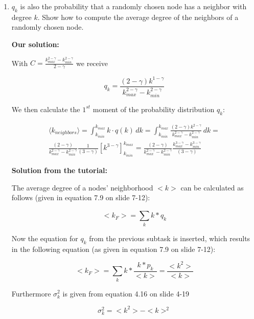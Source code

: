\begin{enumerate}
	\item $q_k$ is also the probability that a randomly chosen node has a neighbor with degree $k$. Show how to compute the average degree of the neighbors of a randomly chosen node.
	
	\textbf{Our solution:}
	
	With $C = \frac{k_{max}^{2-\gamma} - k_{min}^{2-\gamma}}{2-\gamma}$ we receive
	
	\begin{equation}
		q_k = \frac{(2-\gamma)k^{1-\gamma}}{k_{max}^{2-\gamma} - k_{min}^{2-\gamma}}
	\end{equation}

	We then calculate the $1^{st}$ moment of the probability distribution $q_k$:
	
	\begin{equation} \label{k_neighbors}
		\begin{split}
			\langle k_{neighbors} \rangle = \int_{k_{min}}^{k_{max}} k \cdot q(k) \, dk = \int_{k_{min}}^{k_{max}} \frac{(2-\gamma)k^{2-\gamma}}{k_{max}^{2-\gamma} - k_{min}^{2-\gamma}} \, dk = \\
			\frac{(2-\gamma)}{k_{max}^{2-\gamma} - k_{min}^{2-\gamma}} \frac{1}{(3-\gamma)} [k^{3-\gamma}]_{k_{min}}^{k_{max}} = \frac{(2-\gamma)}{k_{max}^{2-\gamma} - k_{min}^{2-\gamma}} \frac{k_{max}^{3-\gamma} - k_{min}^{3-\gamma}}{(3-\gamma)} 
		\end{split}
	\end{equation}
	
	\textbf{Solution from the tutorial:}
	
	The average degree of a nodes' neighborhood $<k>$ can be calculated as follows (given in equation 7.9 on slide 7-12):
	
	\begin{equation}
		<k_F> = \sum_{k}^{} k * q_k
	\end{equation}
	
	Now the equation for $q_k$ from the previous subtask is inserted, which results in the following equation (as given in equation 7.9 on slide 7-12):
	
	\begin{equation} \label{eq:seven}
		<k_F> = \sum_{k}^{} k * \frac{k * p_k}{<k>} = \frac{<k^2>}{<k>}
	\end{equation}
	
	Furthermore $\sigma_k^2$ is given from equation 4.16 on slide 4-19
	
	\begin{equation}
		\sigma_k^2 = <k^2> - <k>^2
	\end{equation}
	

\end{enumerate}
